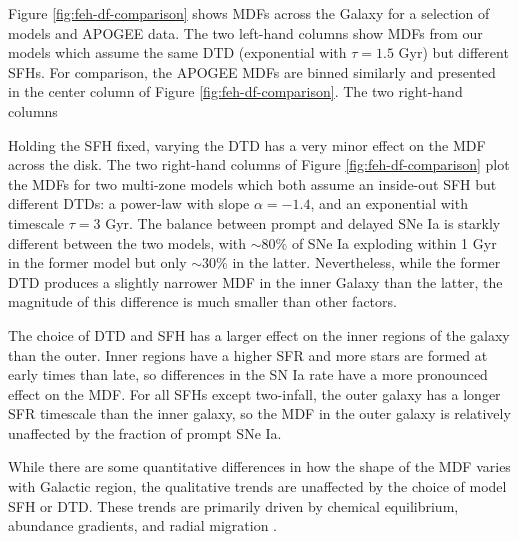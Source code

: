 \documentclass[twocolumn,twocolappendix,linenumbers,trackchanges]{aastex631}
\begin{document}
Figure \ref{fig:feh-df-comparison} shows MDFs across the Galaxy for a selection of models and APOGEE data. The two left-hand columns show MDFs from our models which assume the same DTD (exponential with $\tau=1.5$ Gyr) but different SFHs. For comparison, the APOGEE MDFs are binned similarly and presented in the center column of Figure \ref{fig:feh-df-comparison}.  The two right-hand columns

Holding the SFH fixed, varying the DTD has a very minor effect on the MDF across the disk. The two right-hand columns of Figure \ref{fig:feh-df-comparison} plot the MDFs for two multi-zone models which both assume an inside-out SFH but different DTDs: a power-law with slope $\alpha=-1.4$, and an exponential with timescale $\tau=3$ Gyr. The balance between prompt and delayed SNe Ia is starkly different between the two models, with $\sim 80\%$ of SNe Ia exploding within 1 Gyr in the former model but only $\sim 30\%$ in the latter. Nevertheless, while the former DTD produces a slightly narrower MDF in the inner Galaxy than the latter, the magnitude of this difference is much smaller than other factors.

The choice of DTD and SFH has a larger effect on the inner regions of the galaxy than the outer. Inner regions have a higher SFR and more stars are formed at early times than late, so differences in the SN Ia rate have a more pronounced effect on the MDF. For all SFHs except two-infall, the outer galaxy has a longer SFR timescale than the inner galaxy, so the MDF in the outer galaxy is relatively unaffected by the fraction of prompt SNe Ia.

While there are some quantitative differences in how the shape of the MDF varies with Galactic region, the qualitative trends are unaffected by the choice of model SFH or DTD. These trends are primarily driven by chemical equilibrium, abundance gradients, and radial migration .
\end{document}
